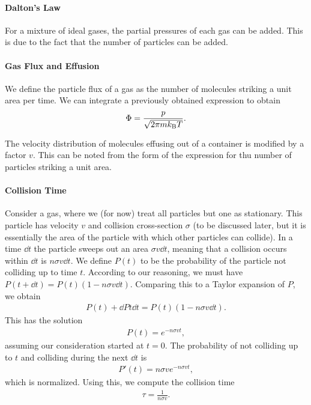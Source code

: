 \paragraph{Dalton's Law}
For a mixture of ideal gases, the partial pressures of each gas can be added. This is due to the fact that the number of particles can be added.

\paragraph{Gas Flux and Effusion}
We define the particle flux of a gas as the number of molecules striking a unit area per time. We can integrate a previously obtained expression to obtain
\begin{align*}
	\Phi = \frac{p}{\sqrt{2\pi mk_{\text{B}} T}}.
\end{align*}

The velocity distribution of molecules effusing out of a container is modified by a factor $v$. This can be noted from the form of the expression for thu number of particles striking a unit area.

\paragraph{Collision Time}
Consider a gas, where we (for now) treat all particles but one as stationary. This particle has velocity $v$ and collision cross-section $\sigma$ (to be discussed later, but it is essentially the area of the particle with which other particles can collide). In a time $\dd{t}$ the particle sweeps out an area $\sigma v\dd{t}$, meaning that a collision occurs within $\dd{t}$ is $n\sigma v\dd{t}$. We define $P(t)$ to be the probability of the particle not colliding up to time $t$. According to our reasoning, we must have $P(t + \dd{t}) = P(t)(1 - n\sigma v\dd{t})$. Comparing this to a Taylor expansion of $P$, we obtain
\begin{align*}
	P(t) + \dd{P}{t}\dd{t} = P(t)(1 - n\sigma v\dd{t}).
\end{align*}
This has the solution
\begin{align*}
	P(t) = e^{-n\sigma vt},
\end{align*}
assuming our consideration started at $t = 0$. The probability of not colliding up to $t$ and colliding during the next $\dd{t}$ is
\begin{align*}
	P'(t) = n\sigma ve^{-n\sigma vt},
\end{align*}
which is normalized. Using this, we compute the collision time
\begin{align*}
	\tau = \frac{1}{n\sigma v}.
\end{align*}

